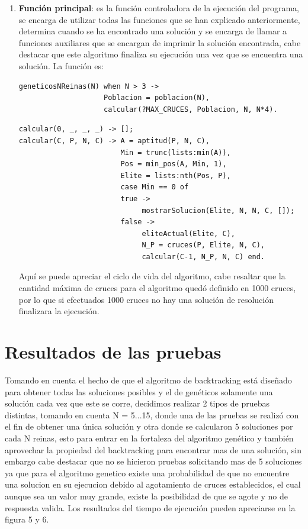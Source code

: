 \documentclass[12pt,a4paper]{article}
\begin{document}
\begin{enumerate}
\begin{enumerate}
\item \textbf{Función principal}: es la función controladora de la ejecución del programa, se encarga de utilizar todas las funciones que se han explicado anteriormente, determina cuando se ha encontrado una solución y se encarga de llamar a funciones auxiliares que se encargan de imprimir la solución encontrada, cabe destacar que este algoritmo finaliza su ejecución una vez que se encuentra una solución. La función es:
\begin{verbatim}
geneticosNReinas(N) when N > 3 -> 
                    Poblacion = poblacion(N),
                    calcular(?MAX_CRUCES, Poblacion, N, N*4).
\end{verbatim}
\begin{verbatim}
calcular(0, _, _, _) -> [];
calcular(C, P, N, C) -> A = aptitud(P, N, C),
                        Min = trunc(lists:min(A)),      
                        Pos = min_pos(A, Min, 1),
                        Elite = lists:nth(Pos, P),
                        case Min == 0 of
                        true -> 
                             mostrarSolucion(Elite, N, N, C, []);
                        false -> 
                             eliteActual(Elite, C),
                             N_P = cruces(P, Elite, N, C),
                             calcular(C-1, N_P, N, C) end.
\end{verbatim}
Aquí se puede apreciar el ciclo de vida del algoritmo, cabe resaltar que la cantidad máxima de cruces para el algoritmo quedó definido en 1000 cruces, por lo que si efectuados 1000 cruces no hay una solución de resolución finalizara la ejecución. 
\end{enumerate}
\end{enumerate}
\pagebreak
\section{Resultados de las pruebas}

Tomando en cuenta el hecho de que el algoritmo de backtracking está diseñado para obtener todas las soluciones posibles y el de genéticos solamente una solución cada vez que este se corre, decidimos realizar 2 tipos de pruebas distintas, tomando en cuenta N = 5...15, donde una de las pruebas se realizó con el fin de obtener una única solución y otra donde se calcularon 5 soluciones por cada N reinas, esto para entrar en la fortaleza del algoritmo genético y también aprovechar la propiedad del backtracking para encontrar mas de una solución, sin embargo cabe destacar que no se hicieron pruebas solicitando mas de 5 soluciones ya que para el algoritmo genetico existe una probabilidad de que no encuentre una solucion en su ejecucion debido al agotamiento de cruces establecidos, el cual aunque sea un valor muy grande, existe la posibilidad de que se agote y no de respuesta valida. Los resultados del tiempo de ejecución pueden apreciarse en la figura 5 y 6.  \\
\end{document}
